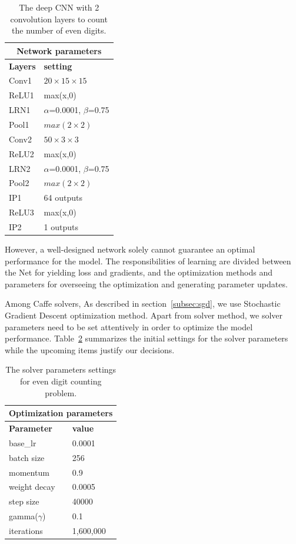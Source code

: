 \begin{table}[H]
	\centering
			\caption{The deep CNN with 2 convolution layers to count the number of even digits.}
	\begin{tabular}{ |p{2cm}|p{2cm}| }
	\hline 
	\multicolumn{2}{|c|}{\textbf{Network parameters}} \\
	\hline
	\hline
	\textbf{Layers} & \textbf{setting }\\
	\hline
	Conv1 & $20\times15\times15$\\
	\hline
	ReLU1 & max(x,0)  \\
	\hline
	LRN1 & $\alpha$=0.0001, $\beta$=0.75\\
	\hline
	Pool1    & $max(2\times2)$ \\
	\hline
	Conv2 & $50\times3\times3$\\
	\hline
	ReLU2 & max(x,0)  \\
	\hline
	LRN2 & $\alpha$=0.0001, $\beta$=0.75\\
	\hline
	Pool2    & $max(2\times2)$ \\
	\hline
	IP1 & 64 outputs \\
	\hline
	ReLU3 & max(x,0)  \\
	\hline
	IP2 & 1 outputs \\
	\hline
	\end{tabular}
		\label{fig:digitnet}
\end{table}




However, a well-designed network solely cannot guarantee an optimal performance for the model. The responsibilities of learning are divided between the Net for yielding loss and gradients, and the optimization methods and parameters for overseeing the optimization and generating parameter updates. 

Among Caffe solvers, As described in section~\ref{subsec:sgd}, we use Stochastic Gradient Descent optimization method. Apart from solver method, we solver parameters need to be set attentively in order to optimize the model performance. Table~\ref{tab:digitsolver} summarizes the initial settings for the solver parameters while the upcoming items justify our decisions.

\begin{table}[H]
	\centering
			\caption{The solver parameters settings for even digit counting problem.}
	\begin{tabular}{ |p{2cm}|p{2cm}| }
	\hline 
	\multicolumn{2}{|c|}{\textbf{Optimization parameters}} \\
	\hline
	\hline
	\textbf{Parameter} & \textbf{value}\\
	\hline
	base\_lr & 0.0001\\
	\hline
	batch size & 256\\
	\hline
	momentum & 0.9  \\
	\hline
	weight decay & 0.0005\\
	\hline
	step size   & 40000 \\
	\hline
	gamma($\gamma$) & 0.1\\
	\hline
	iterations & 1,600,000\\
	\hline
	\end{tabular}

		\label{tab:digitsolver}
\end{table}


